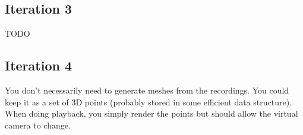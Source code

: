 \documentclass[a4paper,12pt]{article}
\begin{document}
\subsection*{Iteration 3}
TODO

\subsection*{Iteration 4}
You don't necessarily need to generate meshes from the recordings. You could keep it as a set of 3D points (probably stored in some efficient data structure). When doing playback, you simply render the points but should allow the virtual camera to change.
\end{document}
